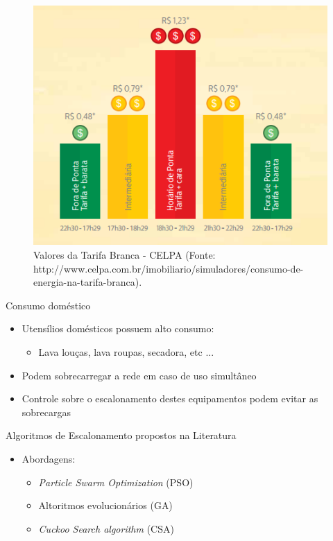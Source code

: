 \begin{frame}
  \begin{figure}[h]
  	\begin{center}
      \includegraphics [scale=0.7]{./Figures/TarifaBranca}
      \caption {Valores da Tarifa Branca - CELPA (Fonte:
      http://www.celpa.com.br/imobiliario/simuladores/consumo-de-energia-na-tarifa-branca).}
  	\end{center}
  \end{figure}
\end{frame}

\begin{frame}
  \begin{block}{Consumo doméstico}
    \begin{itemize}
      \item Utensílios domésticos possuem alto consumo:
      \begin{itemize}
        \item Lava louças, lava roupas, secadora, etc ...
      \end{itemize}
      \item Podem sobrecarregar a rede em caso de uso simultâneo
      \item Controle sobre o escalonamento destes equipamentos podem evitar
      as sobrecargas
    \end{itemize}
  \end{block}
  \pause
  \begin{block}{Algoritmos de Escalonamento propostos na Literatura}
    \begin{itemize}
      \item Abordagens:
      \begin{itemize}
        \item \textit{Particle Swarm Optimization} (PSO)
        \item Altoritmos evolucionários (GA)
        \item \textit{Cuckoo Search algorithm} (CSA)
      \end{itemize}
    \end{itemize}
  \end{block}
\end{frame}

